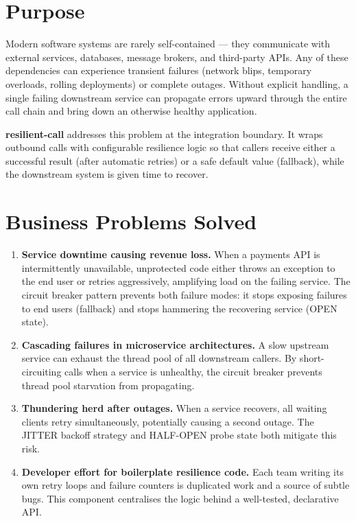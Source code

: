 \section{Purpose}
\label{sec:purpose}

Modern software systems are rarely self-contained — they communicate with
external services, databases, message brokers, and third-party APIs.  Any of
these dependencies can experience transient failures (network blips, temporary
overloads, rolling deployments) or complete outages.  Without explicit handling,
a single failing downstream service can propagate errors upward through the
entire call chain and bring down an otherwise healthy application.

\textbf{resilient-call} addresses this problem at the integration boundary.
It wraps outbound calls with configurable resilience logic so that callers
receive either a successful result (after automatic retries) or a safe default
value (fallback), while the downstream system is given time to recover.

\section{Business Problems Solved}
\label{sec:business-problems}

\begin{enumerate}[leftmargin=*, label=\arabic*.]
    \item \textbf{Service downtime causing revenue loss.}
          When a payments API is intermittently unavailable, unprotected code
          either throws an exception to the end user or retries aggressively,
          amplifying load on the failing service.  The circuit breaker pattern
          prevents both failure modes: it stops exposing failures to end users
          (fallback) and stops hammering the recovering service (OPEN state).

    \item \textbf{Cascading failures in microservice architectures.}
          A slow upstream service can exhaust the thread pool of all downstream
          callers.  By short-circuiting calls when a service is unhealthy, the
          circuit breaker prevents thread pool starvation from propagating.

    \item \textbf{Thundering herd after outages.}
          When a service recovers, all waiting clients retry simultaneously,
          potentially causing a second outage.  The JITTER backoff strategy and
          HALF-OPEN probe state both mitigate this risk.

    \item \textbf{Developer effort for boilerplate resilience code.}
          Each team writing its own retry loops and failure counters is
          duplicated work and a source of subtle bugs.  This component
          centralises the logic behind a well-tested, declarative API.
\end{enumerate}

